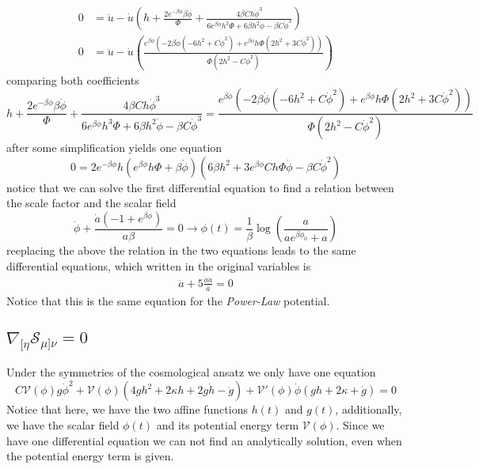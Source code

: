 \documentclass[10pt,a4paper]{article}
\begin{document}
\begin{align}
  0 & = \ddot{u} -\dot{u}\left( h + \frac{2e^{-\beta\phi}\beta\dot{\phi}}{\Phi} + \frac{4\beta C h\dot{\phi}^3}{6e^{\beta\phi}h^3\Phi + 6\beta h^2 \dot{\phi} - \beta C\dot{\phi}^3}\right) \\
  0 & = \ddot{u} -\dot{u}\left(\frac{e^{\beta\phi}\left(-2\beta\dot{\phi}\left(-6h^2 + C\dot{\phi}^2\right) + e^{\beta\phi}h\Phi \left(2h^2 + 3C\dot{\phi}^2\right)\right)}{\Phi \left(2h^2 - C\dot{\phi}^2\right)}\right)
\end{align}
comparing both coefficients 
\begin{equation}
  h + \frac{2e^{-\beta\phi}\beta\dot{\phi}}{\Phi} + \frac{4\beta C h\dot{\phi}^3}{6e^{\beta\phi}h^3\Phi + 6\beta h^2 \dot{\phi} - 
  \beta C\dot{\phi}^3} = \frac{e^{\beta\phi}\left(-2\beta\dot{\phi}\left(-6h^2 + C\dot{\phi}^2\right) + e^{\beta\phi}h\Phi 
  \left(2h^2 + 3C\dot{\phi}^2\right)\right)}{\Phi \left(2h^2 - C\dot{\phi}^2\right)}
\end{equation}
after some simplification yields one equation
\begin{equation}
  0 = 2e^{-\beta \phi}h \left(e^{\beta\phi}h\Phi + \beta\dot{\phi}\right)\left(6\beta h^2 + 3e^{\beta\phi}C h\Phi \dot{\phi} - \beta C\dot{\phi}^2\right)
\end{equation}
notice that we can solve the first differential equation to find a relation between the scale factor and the scalar field
\begin{equation}
  \dot{\phi} + \frac{\dot{a}\left(-1 + e^{\beta\phi}\right)}{a\beta} = 0 \to \phi (t) = \frac{1}{\beta}\log\left(\frac{a}{ae^{\beta \phi_0} + a}\right)
\end{equation}
reeplacing the above the relation in the two equations leads to the same differential equations, which written in the original variables is
\begin{align}
  \dddot{a} + 5\frac{\ddot{a}\dot{a}}{a} = 0
\end{align}
Notice that this is the same equation for the \textit{Power-Law} potential.


\subsection{$\nabla_{[\eta} \mathcal{S}_{\mu]\nu} = 0 $}

Under the symmetries of the cosmological ansatz we only have one equation 
\begin{equation}
  C\mathcal{V}(\phi)g\dot{\phi}^2 + \mathcal{V}(\phi)\left(4gh^2 +2\kappa h + 2g\dot{h} - \ddot{g}\right) +
  \mathcal{V}'(\phi)\dot{\phi}\left(gh + 2\kappa + \dot{g}\right) = 0
\end{equation}
Notice that here, we have the two affine functions $h(t)$ and $g(t)$, additionally, we have the scalar field $\phi (t)$ and its potential energy term
$\mathcal{V}(\phi)$. Since we have one differential equation we can not find an analytically solution, even when the potential energy term is given.
\end{document}

